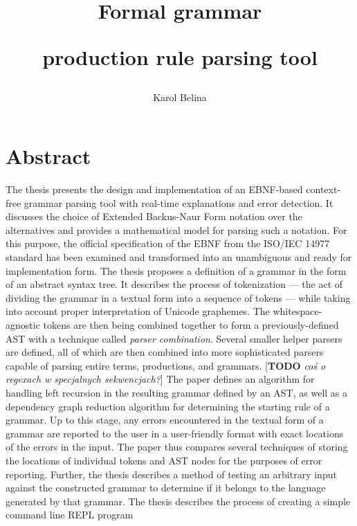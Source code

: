 \documentclass[english,engineering]{wizthesis}
\author{Karol Belina}
\title{Formal grammar\par production rule parsing tool}
\newcommand{\todo}[1]{{\color{red}[\textbf{TODO} \textit{#1}]}}
\begin{document}
\frontmatter %

\maketitle

\chapter*{Abstract}

The thesis presents the design and implementation of an EBNF-based context-free
grammar parsing tool with real-time explanations and error detection. It
discusses the choice of Extended Backus-Naur Form notation over the alternatives
and provides a mathematical model for parsing such a notation. For this purpose,
the official specification of the EBNF from the ISO/IEC 14977 standard has been
examined and transformed into an unambiguous and ready for implementation form.
The thesis proposes a definition of a grammar in the form of an abstract syntax
tree. It describes the process of tokenization --- the act of dividing the
grammar in a textual form into a sequence of tokens --- while taking into
account proper interpretation of Unicode graphemes. The whitespace-agnostic
tokens are then being combined together to form a previously-defined AST with a
technique called \textit{parser combination}. Several smaller helper parsers are
defined, all of which are then combined into more sophisticated parsers capable
of parsing entire terms, productions, and grammars. \todo{coś o regexach w
specjalnych sekwencjach?} The paper defines an algorithm for handling left
recursion in the resulting grammar defined by an AST, as well as a dependency
graph reduction algorithm for determining the starting rule of a grammar. Up to
this stage, any errors encountered in the textual form of a grammar are reported
to the user in a user-friendly format with exact locations of the errors in the
input. The paper thus compares several techniques of storing the locations of
individual tokens and AST nodes for the purposes of error reporting. Further,
the thesis describes a method of testing an arbitrary input against the
constructed grammar to determine if it belongs to the language generated by that
grammar.
The thesis describes the process of creating a simple command line REPL program
\end{document}
